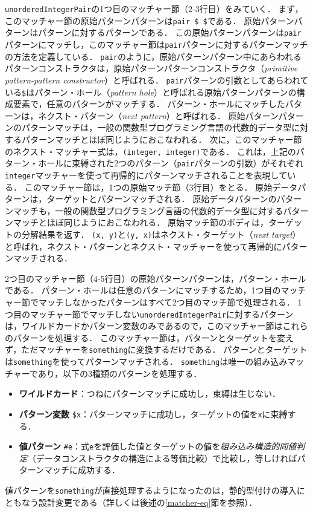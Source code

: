 \lstinline{unorderedIntegerPair}の1つ目のマッチャー節（2-3行目）をみていく．
まず，このマッチャー節の原始パターンパターンは\lstinline{pair $ $}である．
原始パターンパターンはパターンに対するパターンである．
この原始パターンパターンは\lstinline{pair}パターンにマッチし，このマッチャー節は\lstinline{pair}パターンに対するパターンマッチの方法を定義している．
\lstinline{pair}のように，原始パターンパターン中にあらわれるパターンコンストラクタは，原始パターンパターンコンストラクタ（\emph{primitive pattern-pattern constructor}）と呼ばれる．
\lstinline{pair}パターンの引数としてあらわれている\lstinline{$}はパターン・ホール（\emph{pattern hole}）と呼ばれる原始パターンパターンの構成要素で，任意のパターンがマッチする．
パターン・ホールにマッチしたパターンは，ネクスト・パターン（\emph{next pattern}）と呼ばれる．
原始パターンパターンのパターンマッチは，一般の関数型プログラミング言語の代数的データ型に対するパターンマッチとほぼ同じようにおこなわれる．
次に，このマッチャー節のネクスト・マッチャー式は，\lstinline{(integer, integer)}である．
これは，上記のパターン・ホールに束縛された2つのパターン（\lstinline{pair}パターンの引数）がそれぞれ\lstinline{integer}マッチャーを使って再帰的にパターンマッチされることを表現している．
このマッチャー節は，1つの原始マッチ節（3行目）をとる．
原始データパターンは，ターゲットとパターンマッチされる．
原始データパターンのパターンマッチも，一般の関数型プログラミング言語の代数的データ型に対するパターンマッチとほぼ同じようにおこなわれる．
原始マッチ節のボディは，ターゲットの分解結果を返す．
\lstinline{(x, y)}と\lstinline{(y, x)}はネクスト・ターゲット（\emph{next target}）と呼ばれ，ネクスト・パターンとネクスト・マッチャーを使って再帰的にパターンマッチされる．

2つ目のマッチャー節（4-5行目）の原始パターンパターンは，パターン・ホールである．
パターン・ホールは任意のパターンにマッチするため，1つ目のマッチャー節でマッチしなかったパターンはすべて2つ目のマッチ節で処理される．
1つ目のマッチャー節でマッチしない\lstinline{unorderedIntegerPair}に対するパターンは，ワイルドカードかパターン変数のみであるので，このマッチャー節はこれらのパターンを処理する．
このマッチャー節は，パターンとターゲットを変えず，ただマッチャーを\lstinline{something}に変換するだけである．
パターンとターゲットは\lstinline{something}を使ってパターンマッチされる．
\lstinline{something}は唯一の組み込みマッチャーであり，以下の3種類のパターンを処理する．
\begin{itemize}
  \item \textbf{ワイルドカード}：つねにパターンマッチに成功し，束縛は生じない．
  \item \textbf{パターン変数} \lstinline{$x}：パターンマッチに成功し，ターゲットの値を\lstinline{x}に束縛する．
  \item \textbf{値パターン} \lstinline{#e}：式\lstinline{e}を評価した値とターゲットの値を\emph{組み込み構造的同値判定}（データコンストラクタの構造による等価比較）で比較し，等しければパターンマッチに成功する．
\end{itemize}
値パターンを\lstinline{something}が直接処理するようになったのは，静的型付けの導入にともなう設計変更である（詳しくは後述の\ref{matcher-eq}節を参照）．

